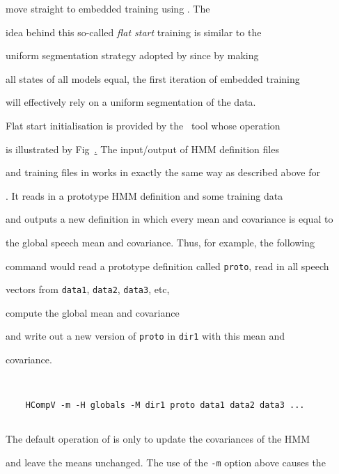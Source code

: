move straight to embedded training using .  The


idea behind this so-called \textit{flat start} training is similar to the


uniform segmentation strategy adopted by  since by making


all states of all models equal, the first iteration of embedded training


will effectively rely on a uniform segmentation of the data.










Flat start initialisation is provided by the \HTK\ tool  whose operation


is illustrated by Fig~\href{f:flatst}.  The input/output of HMM definition files


and training files in  works in exactly the same way as described above for


.  It reads in a prototype HMM definition and some training data


and outputs a new definition in which every mean and covariance is equal to 


the global speech mean and covariance.  Thus, for example, the following


command would read a prototype definition called \texttt{proto}, read in all speech


vectors from \texttt{data1}, \texttt{data2}, \texttt{data3}, etc, 


compute the global mean and covariance


and write out a new version of \texttt{proto} in \texttt{dir1} with this mean and


covariance.


\begin{verbatim}


    HCompV -m -H globals -M dir1 proto data1 data2 data3 ...


\end{verbatim}





The default operation of  is only to update the covariances of the HMM


and leave the means unchanged.  The use of the \texttt{-m} option above causes the


